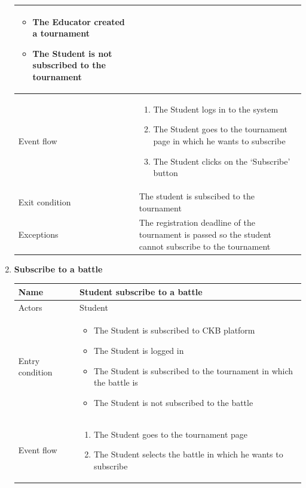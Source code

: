 \begin{enumerate}[label=UC\arabic*:]
\begin{tabular}{|p{3cm}|p{8cm}|}
\begin{itemize}
            \item The Educator created a tournament
            \item The Student is not subscribed to the tournament
        \end{itemize}
        \\
        \hline
        Event flow &
        \begin{enumerate}[label=\arabic*.]
            \item The Student logs in to the system
            \item The Student goes to the tournament page in which he wants to subscribe
            \item The Student clicks on the `Subscribe' button
        \end{enumerate} \\
        \hline
        Exit condition & The student is subscibed to the tournament \\
        \hline
        Exceptions & The registration deadline of the tournament is passed so
        the student cannot subscribe to the tournament \\
        \hline
    \end{tabular}
    \item \textbf{Subscribe to a battle} \\
    \begin{tabular}{|p{3cm}|p{8cm}|}
        \hline
        Name & Student subscribe to a battle \\
        \hline
        Actors & Student \\
        \hline
        Entry condition &
        \begin{itemize}
            \item The Student is subscribed to CKB platform
            \item The Student is logged in
            \item The Student is subscribed to the tournament in which the battle is
            \item The Student is not subscribed to the battle
        \end{itemize}
        \\
        \hline
        Event flow &
        \begin{enumerate}[label=\arabic*.]      
            \item The Student goes to the tournament page
            \item The Student selects the battle in which he wants to subscribe

\end{enumerate}
\end{tabular}
\end{enumerate}
